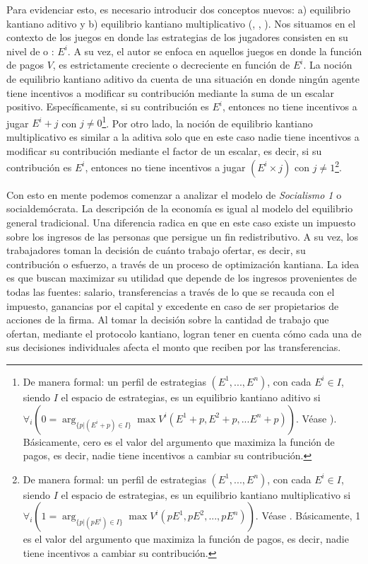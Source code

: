 Para evidenciar esto, es necesario introducir dos conceptos nuevos: a) equilibrio kantiano aditivo y b) equilibrio kantiano multiplicativo (\citeauthor{Roemer_2019}, \citeyear{Roemer_2019}, \citeyear{Roemer_2021a}). Nos situamos en el contexto de los juegos en donde las estrategias de los jugadores consisten en su nivel de  o : $E^i$. A su vez, el autor se enfoca en aquellos juegos en donde la función de pagos $V$, es estrictamente creciente o decreciente en función de $E^i$.  La noción de equilibrio kantiano aditivo da cuenta de una situación en donde ningún agente tiene incentivos a modificar su contribución mediante la suma de un escalar positivo. Específicamente, si su contribución es $E^i$, entonces no tiene incentivos a jugar $E^i + j$ con $j \neq 0$\footnote{De manera formal: un perfil de estrategias $(E^1,..., E^n)$, con cada $E^i \in I$, siendo $I$ el espacio de estrategias, es un equilibrio kantiano aditivo si $\forall_i (0 = \arg_{\{p|(E^i + p) \in I\}} \max V^i (E^1 + p, E^2 + p, ... E^n + p))$. Véase \citet[p. 578]{Roemer_2021a}). Básicamente, cero es el valor del argumento que maximiza la función de pagos, es decir, nadie tiene incentivos a cambiar su contribución.}. Por otro lado, la noción de equilibrio kantiano multiplicativo es similar a la aditiva solo que en este caso nadie tiene incentivos a modificar su contribución mediante el factor de un escalar, es decir, si su contribución es $E^i$, entonces no tiene incentivos a jugar $(E^i \times j)$ con $j \neq 1$\footnote{De manera formal: un perfil de estrategias $(E^1,..., E^n)$, con cada $E^i \in I$, siendo $I$ el espacio de estrategias, es un equilibrio kantiano multiplicativo si $\forall_i (1 = \arg_{\{p|(p E^i) \in I\}} \max V^i (p E^1, p E^2, ..., p E^n))$. Véase \citet[p. 578]{Roemer_2021a}. Básicamente, 1 es el valor del argumento que maximiza la función de pagos, es decir, nadie tiene incentivos a cambiar su contribución.}.

Con esto en mente podemos comenzar a analizar el modelo de \textit{Socialismo 1} o socialdemócrata. La descripción de la economía es igual al modelo del equilibrio general tradicional. Una diferencia radica en que en este caso existe un impuesto sobre los ingresos de las personas que persigue un fin redistributivo. A su vez, los trabajadores toman la decisión de cuánto trabajo ofertar, es decir, su contribución o esfuerzo, a través de un proceso de optimización kantiana. La idea es que buscan maximizar su utilidad que depende de los ingresos provenientes de todas las fuentes: salario, transferencias a través de lo que se recauda con el impuesto, ganancias por el capital y excedente en caso de ser propietarios de acciones de la firma. Al tomar la decisión sobre la cantidad de trabajo que ofertan, mediante el protocolo kantiano, logran tener en cuenta cómo cada una de sus decisiones individuales afecta el monto que reciben por las transferencias. 


